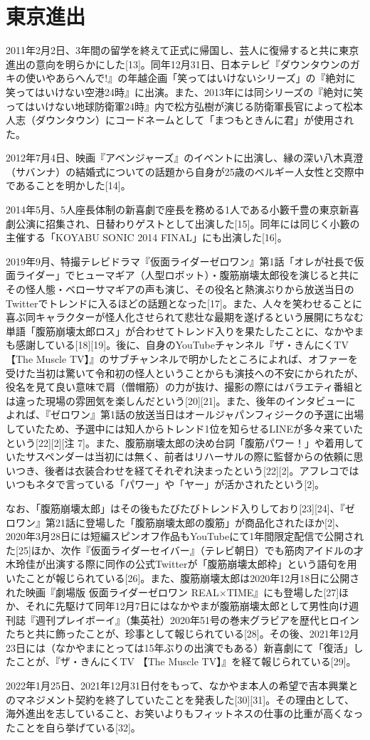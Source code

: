 \section{東京進出}
2011年2月2日、3年間の留学を終えて正式に帰国し、芸人に復帰すると共に東京進出の意向を明らかにした[13]。同年12月31日、日本テレビ『ダウンタウンのガキの使いやあらへんで!』の年越企画「笑ってはいけないシリーズ」の『絶対に笑ってはいけない空港24時』に出演。また、2013年には同シリーズの『絶対に笑ってはいけない地球防衛軍24時』内で松方弘樹が演じる防衛軍長官によって松本人志（ダウンタウン）にコードネームとして「まつもときんに君」が使用された。

2012年7月4日、映画『アベンジャーズ』のイベントに出演し、縁の深い八木真澄（サバンナ）の結婚式についての話題から自身が25歳のベルギー人女性と交際中であることを明かした[14]。

2014年5月、5人座長体制の新喜劇で座長を務める1人である小籔千豊の東京新喜劇公演に招集され、日替わりゲストとして出演した[15]。同年には同じく小籔の主催する「KOYABU SONIC 2014 FINAL」にも出演した[16]。

2019年9月、特撮テレビドラマ『仮面ライダーゼロワン』第1話「オレが社長で仮面ライダー」でヒューマギア（人型ロボット）・腹筋崩壊太郎役を演じると共にその怪人態・ベローサマギアの声も演じ、その役名と熱演ぶりから放送当日のTwitterでトレンドに入るほどの話題となった[17]。また、人々を笑わせることに喜ぶ同キャラクターが怪人化させられて悲壮な最期を遂げるという展開にちなむ単語「腹筋崩壊太郎ロス」が合わせてトレンド入りを果たしたことに、なかやまも感謝している[18][19]。後に、自身のYouTubeチャンネル『ザ・きんにくTV 【The Muscle TV】』のサブチャンネルで明かしたところによれば、オファーを受けた当初は驚いて令和初の怪人ということからも演技への不安にかられたが、役名を見て良い意味で肩（僧帽筋）の力が抜け、撮影の際にはバラエティ番組とは違った現場の雰囲気を楽しんだという[20][21]。また、後年のインタビューによれば、『ゼロワン』第1話の放送当日はオールジャパンフィジークの予選に出場していたため、予選中には知人からトレンド1位を知らせるLINEが多々来ていたという[22][2][注 7]。また、腹筋崩壊太郎の決め台詞「腹筋パワー！」や着用していたサスペンダーは当初には無く、前者はリハーサルの際に監督からの依頼に思いつき、後者は衣装合わせを経てそれぞれ決まったという[22][2]。アフレコではいつもネタで言っている「パワー」や「ヤー」が活かされたという[2]。

なお、「腹筋崩壊太郎」はその後もたびたびトレンド入りしており[23][24]、『ゼロワン』第21話に登場した「腹筋崩壊太郎の腹筋」が商品化されたほか[2]、2020年3月28日には短編スピンオフ作品もYouTubeにて1年間限定配信で公開された[25]ほか、次作『仮面ライダーセイバー』（テレビ朝日）でも筋肉アイドルの才木玲佳が出演する際に同作の公式Twitterが「腹筋崩壊太郎枠」という語句を用いたことが報じられている[26]。また、腹筋崩壊太郎は2020年12月18日に公開された映画『劇場版 仮面ライダーゼロワン REAL×TIME』にも登場した[27]ほか、それに先駆けて同年12月7日にはなかやまが腹筋崩壊太郎として男性向け週刊誌『週刊プレイボーイ』（集英社）2020年51号の巻末グラビアを歴代ヒロインたちと共に飾ったことが、珍事として報じられている[28]。その後、2021年12月23日には（なかやまにとっては15年ぶりの出演でもある）新喜劇にて「復活」したことが、『ザ・きんにくTV 【The Muscle TV】』を経て報じられている[29]。

2022年1月25日、2021年12月31日付をもって、なかやま本人の希望で吉本興業とのマネジメント契約を終了していたことを発表した[30][31]。その理由として、海外進出を志していること、お笑いよりもフィットネスの仕事の比重が高くなったことを自ら挙げている[32]。